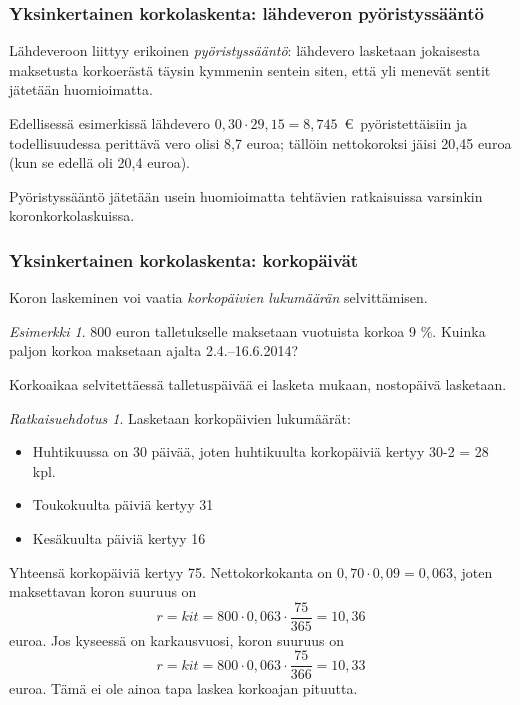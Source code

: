 \documentclass[handout]{beamer}\usepackage[]{graphicx}\usepackage[]{color}
\theoremstyle{remark}
\newtheorem{esim}{Esimerkki}
\newtheorem{ratkaisu}{Ratkaisuehdotus}
\begin{document}
\begin{frame}
    \frametitle{Yksinkertainen korkolaskenta: lähdeveron pyöristyssääntö}
    \pause
    \pause
    Lähdeveroon liittyy erikoinen \emph{pyöristyssääntö}:
    lähdevero lasketaan jokaisesta maksetusta korkoerästä täysin kymmenin sentein siten,
    että yli menevät sentit jätetään huomioimatta.
    \begin{block}{}
      Edellisessä esimerkissä lähdevero \(0,30\cdot29{,}15 = 8{,}745\)~\euro\ pyöristettäisiin ja todellisuudessa perittävä vero olisi 8{,}7 euroa; tällöin nettokoroksi jäisi 20{,}45 euroa (kun se edellä oli 20{,}4 euroa).
      \end{block}
    Pyöristyssääntö jätetään usein huomioimatta tehtävien ratkaisuissa varsinkin koronkorkolaskuissa.
\end{frame}

\begin{frame}
    \frametitle{Yksinkertainen korkolaskenta: korkopäivät}
    \pause
    Koron laskeminen voi vaatia \emph{korkopäivien lukumäärän} selvittämisen.
    \pause
    \begin{esim}
        800 euron talletukselle maksetaan vuotuista korkoa 9 \%. Kuinka paljon korkoa maksetaan ajalta 2.4.--16.6.2014?
    \end{esim}
    \pause
    Korkoaikaa selvitettäessä talletuspäivää ei lasketa mukaan, nostopäivä lasketaan.
\end{frame}

\begin{frame}
    \begin{ratkaisu}
         Lasketaan korkopäivien lukumäärät:\pause
        \begin{itemize}
            \item Huhtikuussa on 30 päivää, joten huhtikuulta korkopäiviä kertyy 30-2 = 28 kpl.\pause
            \item Toukokuulta päiviä kertyy 31\pause
            \item Kesäkuulta päiviä kertyy 16
        \end{itemize}
        Yhteensä korkopäiviä kertyy 75. Nettokorkokanta on \(0,70\cdot0,09 = 0,063\), joten maksettavan koron suuruus on\pause
        \[
            r = kit = 800\cdot 0,063\cdot \frac{75}{365} = 10,36
        \]
        euroa. \pause Jos kyseessä on karkausvuosi, koron suuruus on
        \[
            r = kit = 800\cdot 0,063\cdot \frac{75}{366} = 10,33
        \]
        euroa. \pause Tämä ei ole ainoa tapa laskea korkoajan pituutta.
    \end{ratkaisu}
\end{frame}
\end{document}
